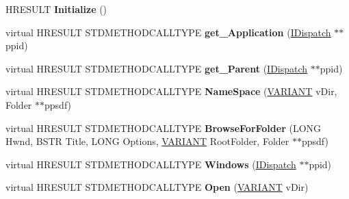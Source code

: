 \begin{DoxyCompactItemize}
\item 
\mbox{\label{class_c_shell_dispatch_a082e6d097e235f642026546a7b98c6d2}} 
H\+R\+E\+S\+U\+LT {\bfseries Initialize} ()
\item 
\mbox{\label{class_c_shell_dispatch_ae78cbe077576e0cb40b250552ba627b0}} 
virtual H\+R\+E\+S\+U\+LT S\+T\+D\+M\+E\+T\+H\+O\+D\+C\+A\+L\+L\+T\+Y\+PE {\bfseries get\+\_\+\+Application} (\hyperlink{interface_i_dispatch}{I\+Dispatch} $\ast$$\ast$ppid)
\item 
\mbox{\label{class_c_shell_dispatch_ab90f91dc5e75e0c2104aed2fafd93d36}} 
virtual H\+R\+E\+S\+U\+LT S\+T\+D\+M\+E\+T\+H\+O\+D\+C\+A\+L\+L\+T\+Y\+PE {\bfseries get\+\_\+\+Parent} (\hyperlink{interface_i_dispatch}{I\+Dispatch} $\ast$$\ast$ppid)
\item 
\mbox{\label{class_c_shell_dispatch_a49ecb2f3ceb85c620982f3a43d6ba5d8}} 
virtual H\+R\+E\+S\+U\+LT S\+T\+D\+M\+E\+T\+H\+O\+D\+C\+A\+L\+L\+T\+Y\+PE {\bfseries Name\+Space} (\hyperlink{structtag_v_a_r_i_a_n_t}{V\+A\+R\+I\+A\+NT} v\+Dir, Folder $\ast$$\ast$ppsdf)
\item 
\mbox{\label{class_c_shell_dispatch_a77581cd0849844ddfcbb5f4616d9a31f}} 
virtual H\+R\+E\+S\+U\+LT S\+T\+D\+M\+E\+T\+H\+O\+D\+C\+A\+L\+L\+T\+Y\+PE {\bfseries Browse\+For\+Folder} (L\+O\+NG Hwnd, B\+S\+TR Title, L\+O\+NG Options, \hyperlink{structtag_v_a_r_i_a_n_t}{V\+A\+R\+I\+A\+NT} Root\+Folder, Folder $\ast$$\ast$ppsdf)
\item 
\mbox{\label{class_c_shell_dispatch_af0e8c2741b0d2a9f98132da0b73751d4}} 
virtual H\+R\+E\+S\+U\+LT S\+T\+D\+M\+E\+T\+H\+O\+D\+C\+A\+L\+L\+T\+Y\+PE {\bfseries Windows} (\hyperlink{interface_i_dispatch}{I\+Dispatch} $\ast$$\ast$ppid)
\item 
\mbox{\label{class_c_shell_dispatch_acb5792498dbea893954f6148c76e0da7}} 
virtual H\+R\+E\+S\+U\+LT S\+T\+D\+M\+E\+T\+H\+O\+D\+C\+A\+L\+L\+T\+Y\+PE {\bfseries Open} (\hyperlink{structtag_v_a_r_i_a_n_t}{V\+A\+R\+I\+A\+NT} v\+Dir)
\item 
\mbox{\label{class_c_shell_dispatch_a7d1ea7ce9f9d5db5d937cc4e181f5e5f}} 
$$
\end{DoxyCompactItemize}
